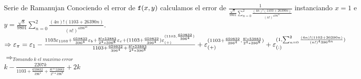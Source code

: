\begin{subsection}{Serie de Ramanujan}
	Conociendo el error de $\texttt{f}(x,y)$ calculamos el error de $\frac{1}{\frac{\sqrt{8}}{9801}\sum_{n=0}^{2}{\frac{(4n)!(1103+26390n)}{(n!)^4396^{4n}}}}$ instanciando $x=1$ e $y=\frac{\sqrt{8}}{9801}\sum_{n=0}^{2}{\frac{(4n)!(1103+26390n)}{(n!)^4396^{4n}}}$.\\
	
	$\Rightarrow \varepsilon _{\pi}=\varepsilon _{1} - \frac{1103\varepsilon _{1103}+\frac{659832}{396^4}\varepsilon _{b} + \frac{8!*53883}{2^4*396^8}\varepsilon _{c} + (1103+\frac{659832}{396^4})\varepsilon _{({+})}^{({1103,\frac{659832}{396^4}})}}{1103+\frac{659832}{396^4}+\frac{8!*53883}{2^4*396^8}} + \varepsilon _{({+})}^{({1103+\frac{659832}{396^4},\frac{8!*53883}{2^4*396^8}})} + \varepsilon _{({:})}^{({1,\sum_{n=0}^{2}{\frac{(4n)!(1103+26390n)}{(n!)^4396^{4n}}}})}$\\
	
	$\Rightarrow_{Tomando \; k \; el \; maximo \; error}$\\
	
	$k - {\frac{2207k}{1103+\frac{659832}{396^4}+\frac{8!*53883}{2^4*396^8}}} + 2k$
\end{subsection}
